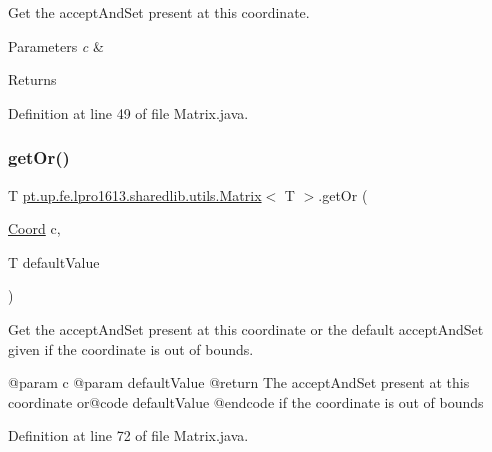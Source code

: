 Get the accept\+And\+Set present at this coordinate.


\begin{DoxyParams}{Parameters}
{\em c} & \\
\hline
\end{DoxyParams}
\begin{DoxyReturn}{Returns}

\end{DoxyReturn}


Definition at line 49 of file Matrix.\+java.

\hypertarget{classpt_1_1up_1_1fe_1_1lpro1613_1_1sharedlib_1_1utils_1_1_matrix_a86f10867379d710d76b482e7eff18990}{}\label{classpt_1_1up_1_1fe_1_1lpro1613_1_1sharedlib_1_1utils_1_1_matrix_a86f10867379d710d76b482e7eff18990} 
\subsubsection{\texorpdfstring{get\+Or()}{getOr()}}
{\footnotesize\ttfamily T \hyperlink{classpt_1_1up_1_1fe_1_1lpro1613_1_1sharedlib_1_1utils_1_1_matrix}{pt.\+up.\+fe.\+lpro1613.\+sharedlib.\+utils.\+Matrix}$<$ T $>$.get\+Or (\begin{DoxyParamCaption}\item[{\hyperlink{classpt_1_1up_1_1fe_1_1lpro1613_1_1sharedlib_1_1utils_1_1_coord}{Coord}}]{c,  }\item[{T}]{default\+Value }\end{DoxyParamCaption})}

Get the accept\+And\+Set present at this coordinate or the default accept\+And\+Set given if the coordinate is out of bounds. \begin{DoxyVerb}  @param c
  @param defaultValue
  @return The acceptAndSet present at this coordinate or@code defaultValue @endcode  if
  the coordinate is out of bounds\end{DoxyVerb}
 

Definition at line 72 of file Matrix.\+java.

\hypertarget{classpt_1_1up_1_1fe_1_1lpro1613_1_1sharedlib_1_1utils_1_1_matrix_a9254b5461b3383c1c53caf3141efcc5b}{}\label{classpt_1_1up_1_1fe_1_1lpro1613_1_1sharedlib_1_1utils_1_1_matrix_a9254b5461b3383c1c53caf3141efcc5b} 
